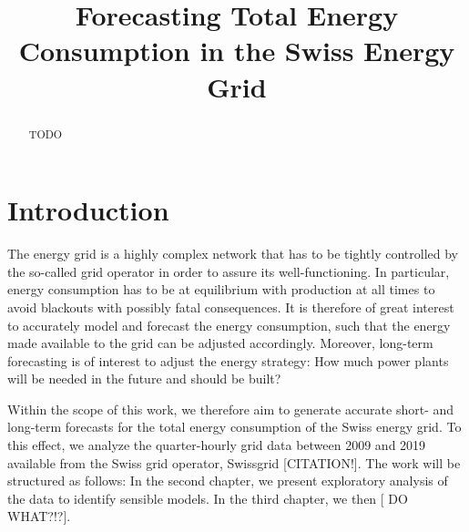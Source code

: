\documentclass[conference]{IEEEtran}
\begin{document}
\title{Forecasting Total Energy Consumption in the Swiss Energy Grid}

\author{
\and
{}
}


\maketitle

\begin{abstract}
TODO
\end{abstract}


\section{Introduction}
The energy grid is a highly complex network that has to be tightly controlled by the so-called grid operator in order to assure its well-functioning. In particular, energy consumption has to be at equilibrium with production at all times to avoid blackouts with possibly fatal consequences. It is therefore of great interest to accurately model and forecast the energy consumption, such that the energy made available to the grid can be adjusted accordingly. Moreover, long-term forecasting is of interest to adjust the energy strategy: How much power plants will be needed in the future and should be built? 
\par
Within the scope of this work, we therefore aim to generate accurate short- and long-term forecasts for the total energy consumption of the Swiss energy grid. To this effect, we analyze the quarter-hourly grid data between 2009 and 2019 available from the Swiss grid operator, Swissgrid [CITATION!]. The work will be structured as follows: In the second chapter, we present exploratory analysis of the data to identify sensible models. In the third chapter, we then [ DO WHAT?!?]. 
\end{document}
